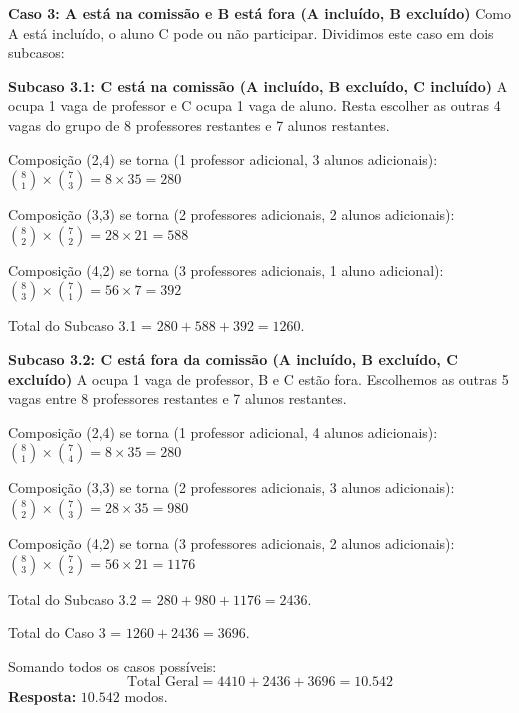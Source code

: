 \documentclass[a4paper,10pt,landscape,twocolumn]{article}  %
\let\oldenumerate\enumerate
\let\oldendenumerate\endenumerate
\renewenvironment{enumerate}{%
  \oldenumerate%
  \setlength{\itemsep}{1pt}%
  \setlength{\parskip}{0pt}%
  \setlength{\parsep}{0pt}%
  \setlength{\topsep}{2pt}%
  \setlength{\partopsep}{0pt}%
}{%
  \oldendenumerate%
}
\let\olditemize\itemize
\let\oldenditemize\enditemize
\renewenvironment{itemize}{%
  \olditemize%
  \setlength{\itemsep}{1pt}%
  \setlength{\parskip}{0pt}%
  \setlength{\parsep}{0pt}%
  \setlength{\topsep}{2pt}%
  \setlength{\partopsep}{0pt}%
}{%
  \oldenditemize%
}
\begin{document}
\begin{enumerate}
    \textbf{Caso 3: A está na comissão e B está fora (A incluído, B excluído)}
    Como A está incluído, o aluno C pode ou não participar. Dividimos este caso em dois subcasos:
    \begin{itemize}
        \item \textbf{Subcaso 3.1: C está na comissão (A incluído, B excluído, C incluído)}
        A ocupa 1 vaga de professor e C ocupa 1 vaga de aluno. Resta escolher as outras 4 vagas do grupo de 8 professores restantes e 7 alunos restantes.
        \begin{itemize}
            \item Composição (2,4) se torna (1 professor adicional, 3 alunos adicionais): $\binom{8}{1} \times \binom{7}{3} = 8 \times 35 = 280$
            \item Composição (3,3) se torna (2 professores adicionais, 2 alunos adicionais): $\binom{8}{2} \times \binom{7}{2} = 28 \times 21 = 588$
            \item Composição (4,2) se torna (3 professores adicionais, 1 aluno adicional): $\binom{8}{3} \times \binom{7}{1} = 56 \times 7 = 392$
            \item Total do Subcaso 3.1 = $280 + 588 + 392 = 1260$.
        \end{itemize}
        \item \textbf{Subcaso 3.2: C está fora da comissão (A incluído, B excluído, C excluído)}
        A ocupa 1 vaga de professor, B e C estão fora. Escolhemos as outras 5 vagas entre 8 professores restantes e 7 alunos restantes.
        \begin{itemize}
            \item Composição (2,4) se torna (1 professor adicional, 4 alunos adicionais): $\binom{8}{1} \times \binom{7}{4} = 8 \times 35 = 280$
            \item Composição (3,3) se torna (2 professores adicionais, 3 alunos adicionais): $\binom{8}{2} \times \binom{7}{3} = 28 \times 35 = 980$
            \item Composição (4,2) se torna (3 professores adicionais, 2 alunos adicionais): $\binom{8}{3} \times \binom{7}{2} = 56 \times 21 = 1176$
            \item Total do Subcaso 3.2 = $280 + 980 + 1176 = 2436$.
        \end{itemize}
        \item Total do Caso 3 = $1260 + 2436 = 3696$.
    \end{itemize}

    Somando todos os casos possíveis:
    \[ \text{Total Geral} = 4410 + 2436 + 3696 = 10.542 \]
    \textbf{Resposta:} $10.542$ modos.


\end{enumerate}
\end{document}
